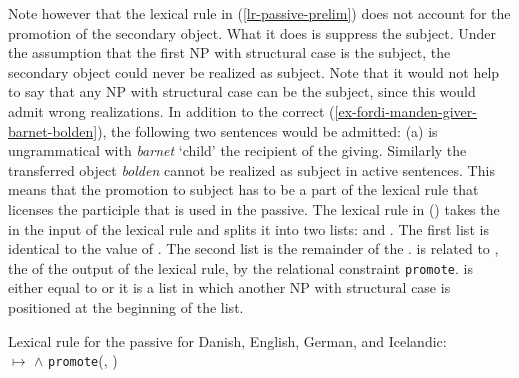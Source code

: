 Note however that the lexical rule in (\ref{lr-passive-prelim}) does not account for the promotion
of the secondary object. What it does is suppress the subject. Under the assumption that the
first NP with structural case is the subject, the secondary object could never be realized as
subject. Note that it would not help to say that any NP with structural case can be the subject, since
this would admit wrong realizations. In addition to the correct
(\ref{ex-fordi-manden-giver-barnet-bolden}), the following two sentences would be admitted: 
\eal
{}
\zl
(a) is ungrammatical with \emph{barnet} `child' the recipient of the giving. Similarly the
transferred object \emph{bolden} cannot be realized as subject in active sentences. This means that
the promotion to subject has to be a part of the lexical  rule that licenses the participle that is
used in the passive. The lexical rule in () takes the \argstl in the input of the lexical rule and splits it into two
lists:  and . The first list  is identical to the value of \da. The second list  is the
remainder of the \argstl.  is related to , the \argstv of the output of the lexical rule, by the relational constraint
\texttt{promote}.  is either equal to  or it is a list in which another NP with
structural case is positioned at the beginning of the list.

\eas
\label{lr-passive-double-object}
Lexical rule for the passive for Danish, English, German, and Icelandic:\\
 $\mapsto$
 $\wedge$ \texttt{promote}(, )
\zs

